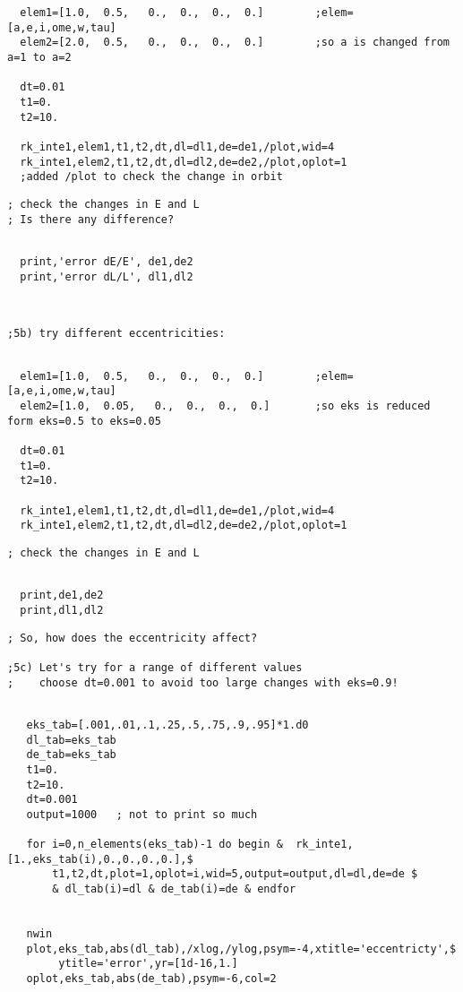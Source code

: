 \documentclass[a4paper,12pt]{article}
\def\red{\color{red}}
\def\black{\color{RGBblack}}
\begin{document}
\red
\begin{verbatim}
  elem1=[1.0,  0.5,   0.,  0.,  0.,  0.]		;elem=[a,e,i,ome,w,tau]
  elem2=[2.0,  0.5,   0.,  0.,  0.,  0.]		;so a is changed from a=1 to a=2

  dt=0.01
  t1=0.
  t2=10.

  rk_inte1,elem1,t1,t2,dt,dl=dl1,de=de1,/plot,wid=4
  rk_inte1,elem2,t1,t2,dt,dl=dl2,de=de2,/plot,oplot=1           
  ;added /plot to check the change in orbit

\end{verbatim}
\black
\begin{verbatim}
; check the changes in E and L
; Is there any difference?
  
\end{verbatim}
\red
\begin{verbatim}
  print,'error dE/E', de1,de2 
  print,'error dL/L', dl1,dl2


\end{verbatim}
\black
\begin{verbatim}

;5b) try different eccentricities:

\end{verbatim}
\red
\begin{verbatim}

  elem1=[1.0,  0.5,   0.,  0.,  0.,  0.]		;elem=[a,e,i,ome,w,tau]
  elem2=[1.0,  0.05,   0.,  0.,  0.,  0.]		;so eks is reduced form eks=0.5 to eks=0.05

  dt=0.01
  t1=0.
  t2=10.

  rk_inte1,elem1,t1,t2,dt,dl=dl1,de=de1,/plot,wid=4
  rk_inte1,elem2,t1,t2,dt,dl=dl2,de=de2,/plot,oplot=1 

\end{verbatim}
\black
\begin{verbatim}
; check the changes in E and L

\end{verbatim}
\red
\begin{verbatim}

  print,de1,de2
  print,dl1,dl2

\end{verbatim}
\black
\begin{verbatim}
; So, how does the eccentricity affect?

;5c) Let's try for a range of different values
;    choose dt=0.001 to avoid too large changes with eks=0.9! 

\end{verbatim}
\red
\begin{verbatim}

   eks_tab=[.001,.01,.1,.25,.5,.75,.9,.95]*1.d0
   dl_tab=eks_tab
   de_tab=eks_tab
   t1=0.
   t2=10.
   dt=0.001
   output=1000   ; not to print so much
  
   for i=0,n_elements(eks_tab)-1 do begin &  rk_inte1,[1.,eks_tab(i),0.,0.,0.,0.],$
       t1,t2,dt,plot=1,oplot=i,wid=5,output=output,dl=dl,de=de $
       & dl_tab(i)=dl & de_tab(i)=de & endfor


   nwin
   plot,eks_tab,abs(dl_tab),/xlog,/ylog,psym=-4,xtitle='eccentricty',$
        ytitle='error',yr=[1d-16,1.]
   oplot,eks_tab,abs(de_tab),psym=-6,col=2

\end{verbatim}
\end{document}
